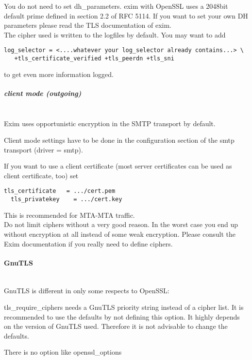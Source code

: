 You do not need to set dh\_parameters. exim with OpenSSL uses a 2048bit default prime defined in section 2.2 of RFC 5114.
If you want to set your own DH parameters please read the TLS documentation of exim.\\

The cipher used is written to the logfiles by default. You may want to add
\begin{lstlisting}[breaklines]
  log_selector = <....whatever your log_selector already contains...> \
   +tls_certificate_verified +tls_peerdn +tls_sni
\end{lstlisting}
to get even more information logged.

\subparagraph*{client mode (outgoing)}\mbox{}\\

Exim uses opportunistic encryption in the SMTP transport by default.

Client mode settings have to be done in the configuration section of the smtp transport (driver = smtp).

If you want to use a client certificate (most server certificates can be used as client certificate, too) set
\begin{lstlisting}[breaklines]
  tls_certificate   = .../cert.pem
  tls_privatekey    = .../cert.key
\end{lstlisting}
This is recommended for MTA-MTA traffic.\\

Do not limit ciphers without a very good reason. In the worst case you end up without encryption at all instead of some weak encryption. Please consult the Exim documentation if you really need to define ciphers.

\paragraph*{GnuTLS}\mbox{}\\

GnuTLS is different in only some respects to OpenSSL:
\begin{list}{•}{•}
\item tls\_require\_ciphers needs a GnuTLS priority string instead of a cipher list. It is recommended to use the defaults by not defining this option. It highly depends on the version of GnuTLS used. Therefore it is not advisable to change the defaults.
\item There is no option like openssl\_options
\end{list}


